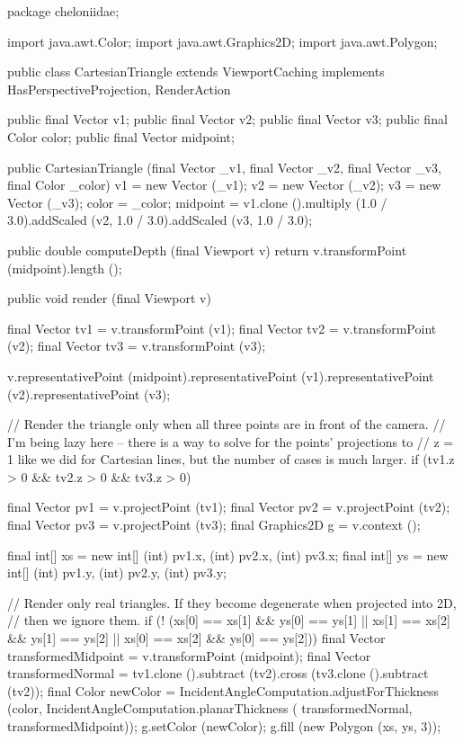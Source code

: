 \documentclass{report}
\begin{document}
\begin{javacode}
package cheloniidae;

import java.awt.Color;
import java.awt.Graphics2D;
import java.awt.Polygon;

public class CartesianTriangle extends ViewportCaching implements HasPerspectiveProjection, RenderAction {
  public final Vector v1;
  public final Vector v2;
  public final Vector v3;
  public final Color  color;
  public final Vector midpoint;

  public CartesianTriangle (final Vector _v1, final Vector _v2, final Vector _v3, final Color _color) {
    v1       = new Vector (_v1);
    v2       = new Vector (_v2);
    v3       = new Vector (_v3);
    color    = _color;
    midpoint = v1.clone ().multiply (1.0 / 3.0).addScaled (v2, 1.0 / 3.0).addScaled (v3, 1.0 / 3.0);
  }

  public double computeDepth (final Viewport v) {return v.transformPoint (midpoint).length ();}

  public void render (final Viewport v) {
    final Vector tv1 = v.transformPoint (v1);
    final Vector tv2 = v.transformPoint (v2);
    final Vector tv3 = v.transformPoint (v3);

    v.representativePoint (midpoint).representativePoint (v1).representativePoint (v2).representativePoint (v3);

    // Render the triangle only when all three points are in front of the camera.
    // I'm being lazy here -- there is a way to solve for the points' projections to
    // z = 1 like we did for Cartesian lines, but the number of cases is much larger.
    if (tv1.z > 0 && tv2.z > 0 && tv3.z > 0) {
      final Vector     pv1 = v.projectPoint (tv1);
      final Vector     pv2 = v.projectPoint (tv2);
      final Vector     pv3 = v.projectPoint (tv3);
      final Graphics2D g   = v.context ();

      final int[] xs = new int[] {(int) pv1.x, (int) pv2.x, (int) pv3.x};
      final int[] ys = new int[] {(int) pv1.y, (int) pv2.y, (int) pv3.y};

      // Render only real triangles. If they become degenerate when projected into 2D,
      // then we ignore them.
      if (! (xs[0] == xs[1] && ys[0] == ys[1] ||
             xs[1] == xs[2] && ys[1] == ys[2] ||
             xs[0] == xs[2] && ys[0] == ys[2])) {
        final Vector transformedMidpoint    = v.transformPoint (midpoint);
        final Vector transformedNormal      = tv1.clone ().subtract (tv2).cross (tv3.clone ().subtract (tv2));
        final Color  newColor               = IncidentAngleComputation.adjustForThickness (color,
                                                IncidentAngleComputation.planarThickness (
                                                  transformedNormal, transformedMidpoint));
        g.setColor (newColor);
        g.fill     (new Polygon (xs, ys, 3));
      }
    }
  }
}
\end{javacode}
\end{document}
